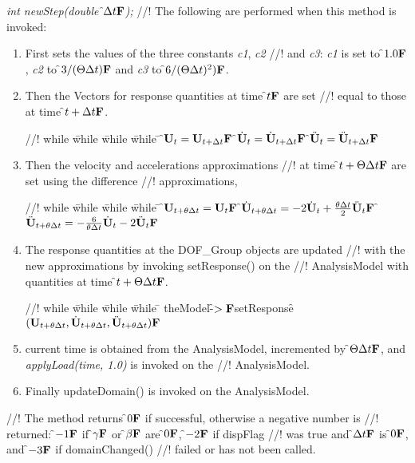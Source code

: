 {{\em int newStep(double \f$\Delta t{\bf F}$);}
//! The following are performed when this method is invoked:
\begin{enumerate}
\item First sets the values of the three constants {\em c1}, {\em c2}
//! and {\em c3}: {\em c1} is set to \f$1.0{\bf F}$, 
{\em c2} to \f$3 / (\Theta
\Delta t){\bf F}$ and {\em c3} to \f$6 / (\Theta \Delta t)^2){\bf F}$. 
\item Then the Vectors for response quantities at time \f$t{\bf F}$ are set
//! equal to those at time \f$t + \Delta t{\bf F}$.
\begin{tabbing}
//! while \= while \= while \= while \= \kill
\>\> \f$ {\bf U}_t = {\bf U}_{t + \Delta t}{\bf F}$
\>\> \f$ \dot{\bf U}_t = \dot{\bf U}_{t + \Delta t} {\bf F}$
\>\> \f$ \ddot{\bf U}_t = \ddot{\bf U}_{t + \Delta t} {\bf F}$ 
\end{tabbing}
\item Then the velocity and accelerations approximations
//! at time \f$t + \Theta \Delta t{\bf F}$ are set using the difference
//! approximations,
\begin{tabbing}
//! while \= while \= while \= while \= \kill
\>\> \f$ {\bf U}_{t + \theta \Delta t} = {\bf U}_t {\bf F}$
\>\> \f$ \dot {{\bf U}}_{t + \theta \Delta t} = - 2 \dot {{\bf U}}_t + \frac{\theta
\Delta t}{2} \ddot {{\bf U}}_t  {\bf F}$
\>\> \f$ \ddot {{\bf U}}_{t + \theta \Delta t} = - \frac{6}{\theta \Delta t}
\dot {{\bf U}}_t -2 \ddot{\bf U}_t {\bf F}$ 
\end{tabbing}
\item The response quantities at the DOF\_Group objects are updated
//! with the new approximations by invoking setResponse() on the
//! AnalysisModel with quantities at time \f$t + \Theta \Delta t{\bf F}$.
\begin{tabbing}
//! while \= while \= while \= while \= \kill
\>\> theModel-\f$>{\bf F}$setResponse\f$({\bf U}_{t + \theta \Delta t}, \dot{\bf U}_{t+\theta
\Delta t}, \ddot{\bf U}_{t+ \theta \Delta t}){\bf F}$ 
\end{tabbing}
\item current time is obtained from the AnalysisModel, incremented by
\f$\Theta \Delta t{\bf F}$, and {\em applyLoad(time, 1.0)} is invoked on the
//! AnalysisModel. 
\item Finally updateDomain() is invoked on the AnalysisModel.
\end{enumerate}
//! The method returns \f$0{\bf F}$ if successful, otherwise a negative number is
//! returned: \f$-1{\bf F}$ if \f$\gamma{\bf F}$ or \f$\beta{\bf F}$ are \f$0{\bf F}$, \f$-2{\bf F}$ if \p dispFlag
//! was true and \f$\Delta t{\bf F}$ is \f$0{\bf F}$, and \f$-3{\bf F}$ if domainChanged()
//! failed or has not been called.



}
